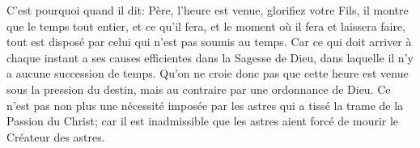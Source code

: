 C’est pourquoi quand il dit: Père, l’heure est venue, glorifiez votre Fils,
	il montre que le temps tout entier,
	et ce qu’il fera, et le moment où il fera et laissera faire,
	tout est disposé par celui qui n’est pas soumis au temps.
Car ce qui doit arriver à chaque instant
		a ses causes efficientes dans la Sagesse de Dieu,
	dans laquelle il n’y a aucune succession de temps.
Qu’on ne croie donc pas que cette heure est venue sous la pression du destin,
	mais au contraire par une ordonnance de Dieu.
Ce n’est pas non plus une nécessité imposée par les astres
		qui a tissé la trame de la Passion du Christ;
	car il est inadmissible que les astres
		aient forcé de mourir le Créateur des astres.
